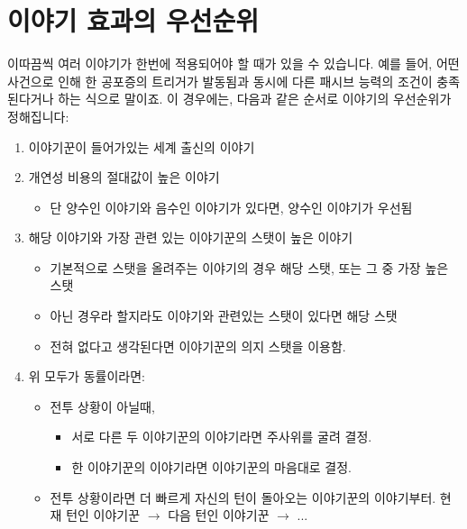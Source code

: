 \documentclass{report}
\begin{document}
	\section*{이야기 효과의 우선순위}
	이따끔씩 여러 이야기가 한번에 적용되어야 할 때가 있을 수 있습니다. 예를 들어, 어떤 사건으로 인해 한 공포증의 트리거가 발동됨과 동시에 다른 패시브 능력의 조건이 충족된다거나 하는 식으로 말이죠. 이 경우에는, 다음과 같은 순서로 이야기의 우선순위가 정해집니다:
	\begin{enumerate}
		\item 이야기꾼이 들어가있는 세계 출신의 이야기
		\item 개연성 비용의 절대값이 높은 이야기
		\begin{itemize}
			\item 단 양수인 이야기와 음수인 이야기가 있다면, 양수인 이야기가 우선됨
		\end{itemize}
		\item 해당 이야기와 가장 관련 있는 이야기꾼의 스탯이 높은 이야기
		\begin{itemize}
			\item 기본적으로 스탯을 올려주는 이야기의 경우 해당 스탯, 또는 그 중 가장 높은 스탯
			\item 아닌 경우라 할지라도 이야기와 관련있는 스탯이 있다면 해당 스탯
			\item 전혀 없다고 생각된다면 이야기꾼의 의지 스탯을 이용함.
		\end{itemize}
		\item 위 모두가 동률이라면:
		\begin{itemize}
			\item 전투 상황이 아닐때, 
			\begin{itemize}
				\item 서로 다른 두 이야기꾼의 이야기라면 주사위를 굴려 결정.
				\item 한 이야기꾼의 이야기라면 이야기꾼의 마음대로 결정.
			\end{itemize}
			\item 전투 상황이라면 더 빠르게 자신의 턴이 돌아오는 이야기꾼의 이야기부터.
			\subitem 현재 턴인 이야기꾼 $\rightarrow$ 다음 턴인 이야기꾼 $\rightarrow$ ...
		\end{itemize}
	\end{enumerate}
	
	
\end{document}
